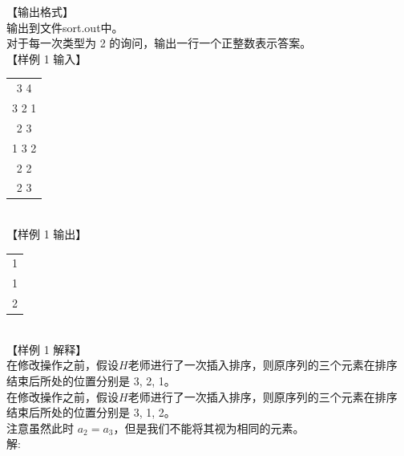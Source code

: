 \documentclass[12pt,twiside,a4paper]{ctexbook}
\numberwithin{chapter}{part}
\begin{document}
【输出格式】\\
输出到文件sort.out中。\\
对于每一次类型为 2 的询问，输出一行一个正整数表示答案。\\
【样例 1 输入】\\
\begin{tabular}{|c|}
  \hline
  3 4 \\
  3 2 1 \\
  2 3 \\
  1 3 2 \\
  2 2 \\
  2 3 \\
  \hline
\end{tabular}\\
【样例 1 输出】\\
\begin{tabular}{|c|}
  \hline
  1 \\
  1 \\
  2 \\
  \hline
\end{tabular}\\
【样例 1 解释】\\
在修改操作之前，假设$H$老师进行了一次插入排序，则原序列的三个元素在排序
结束后所处的位置分别是 3, 2, 1。\\
在修改操作之前，假设$H$老师进行了一次插入排序，则原序列的三个元素在排序
结束后所处的位置分别是 3, 1, 2。\\
注意虽然此时 $a_2 = a_3$，但是我们不能将其视为相同的元素。\\
解:
\end{document}

